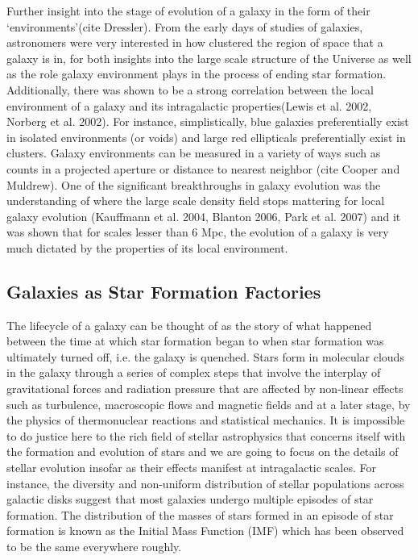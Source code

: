 Further insight into the stage of evolution of a galaxy in the form of their `environments'(cite Dressler). From the early days of studies of galaxies, astronomers were very interested in how clustered the region of space that a galaxy is in, for both insights into the large scale structure of the Universe as well as the role galaxy environment plays in the process of ending star formation. Additionally, there was shown to be a strong correlation between the local environment of a galaxy and its intragalactic properties(Lewis et al. 2002, Norberg et al. 2002). For instance, simplistically, blue galaxies preferentially exist in isolated environments (or voids) and large red ellipticals preferentially exist in clusters. Galaxy environments can be measured in a variety of ways such as counts in a projected aperture or distance to nearest neighbor (cite Cooper and Muldrew). One of the significant breakthroughs in galaxy evolution was the understanding of where the large scale density field stops mattering for local galaxy evolution (Kauffmann et al. 2004, Blanton 2006, Park et al. 2007) and it was shown that for scales lesser than 6 Mpc, the evolution of a galaxy is very much dictated by the properties of its local environment.\\


\subsection{Galaxies as Star Formation Factories}

The lifecycle of a galaxy can be thought of as the story of what happened between the time at which star formation began to when star formation was ultimately turned off, i.e. the galaxy is quenched. Stars form in molecular clouds in the galaxy through a series of complex steps that involve the interplay of gravitational forces and radiation pressure that are affected by non-linear effects such as turbulence, macroscopic flows and magnetic fields and at a later stage, by the physics of thermonuclear reactions and statistical mechanics. It is impossible to do justice here to the rich field of stellar astrophysics that concerns itself with the formation and evolution of stars and we are going to focus on the details of stellar evolution insofar as their effects manifest at intragalactic scales. For instance, the diversity and non-uniform distribution of stellar populations across galactic disks suggest that most galaxies undergo multiple episodes of star formation. The distribution of the masses of stars formed in an episode of star formation is known as the Initial Mass Function (IMF) which has been observed to be the same everywhere roughly.\\

